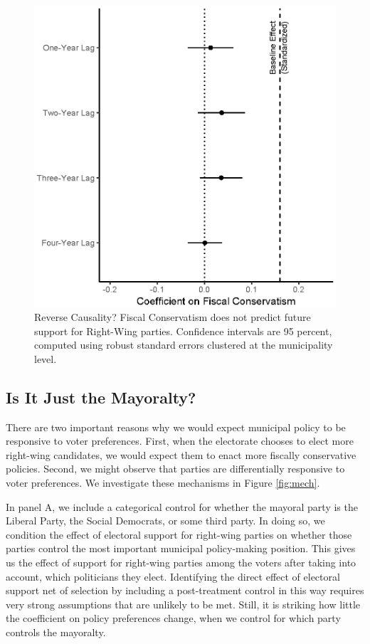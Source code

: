 \documentclass[a4paper,12pt]{article}
\begin{document}
\begin{figure}[!htb]
	\centering
	\includegraphics[scale = 1]{granger_18092018.eps}
	\caption{Reverse Causality? Fiscal Conservatism does not predict future support for Right-Wing parties. Confidence intervals are 95 percent, computed using robust standard errors clustered at the municipality level.} \label{fig:granger}
\end{figure}
\clearpage
\subsection{Is It Just the Mayoralty?}\label{mechanism}

There are two important reasons why we would expect municipal policy to be responsive to voter preferences. First, when the electorate chooses to elect more right-wing candidates, we would expect them to enact more fiscally conservative policies. Second, we might observe that parties are differentially responsive to voter preferences. We investigate these mechanisms in Figure \ref{fig:mech}.

In panel A, we include a categorical control for whether the mayoral party is the Liberal Party, the Social Democrats, or some third party.  In doing so, we condition the effect of electoral support for right-wing parties on whether those parties control the most important municipal policy-making position. This gives us the effect of support for right-wing parties among the voters after taking into account, which politicians they elect. Identifying the direct effect of electoral support net of selection by including a post-treatment control in this way requires very strong assumptions that are unlikely to be met. Still, it is striking how little the coefficient on policy preferences change, when we control for which party controls the mayoralty. 
\end{document}
